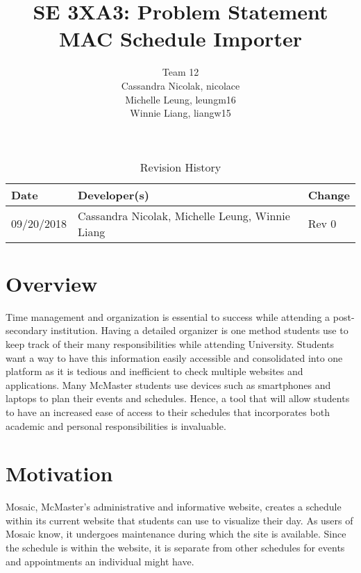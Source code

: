 \documentclass{article}
\title{SE 3XA3: Problem Statement\\MAC Schedule Importer}
\author{Team 12%
		\\ Cassandra Nicolak, nicolace
		\\ Michelle Leung, leungm16
		\\ Winnie Liang, liangw15
}
\date{}
\begin{document}
\begin{table}[hp]
\caption{Revision History} \label{TblRevisionHistory}
\begin{tabularx}{\textwidth}{llX}
\toprule
\textbf{Date} & \textbf{Developer(s)} & \textbf{Change}\\
\midrule
09/20/2018 & Cassandra Nicolak, Michelle Leung, Winnie Liang & Rev 0\\
\bottomrule
\end{tabularx}
\end{table}

\newpage

\maketitle

\section{Overview}
\hspace{5mm}Time management and organization is essential to success while attending a post-secondary institution. Having a detailed organizer is one method students use to keep track of their many responsibilities while attending University. Students want a way to have this information easily accessible and consolidated into one platform as it is tedious and inefficient to check multiple websites and applications. Many McMaster students use devices such as smartphones and laptops to plan their events and schedules. Hence, a tool that will allow students to have an increased ease of access to their schedules that incorporates both academic and personal responsibilities is invaluable.


\section{Motivation}
\hspace{5mm}Mosaic, McMaster's administrative and informative website, creates a schedule within its current website that students can use to visualize their day. As users of Mosaic know, it undergoes maintenance during which the site is available. Since the schedule is within the website, it is separate from other schedules for events and appointments an individual might have. \\
\end{document}
